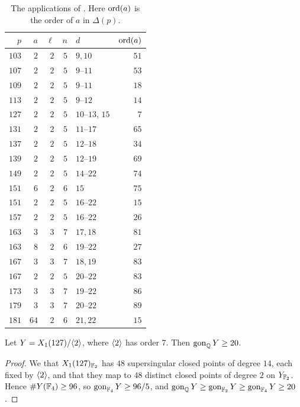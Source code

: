 \begin{table}[H]
\centering
\begin{tabular}{rrrrlr}
\toprule
$p$ & $a$ & $\ell$ & $n$ & $d$ & $\operatorname{ord}(a)$\\
\midrule
$103$ & $2$ & $2$ & $5$ & $9,10$ & $51$\\
$107$ & $2$ & $2$ & $5$ & $9$--$11$ & $53$\\
$109$ & $2$ & $2$ & $5$ & $9$--$11$ & $18$\\
$113$ & $2$ & $2$ & $5$ & $9$--$12$ & $14$\\
$127$ & $2$ & $2$ & $5$ & $10$--$13$, $15$ & $7$\\
$131$ & $2$ & $2$ & $5$ & $11$--$17$ & $65$\\
$137$ & $2$ & $2$ & $5$ & $12$--$18$ & $34$\\
$139$ & $2$ & $2$ & $5$ & $12$--$19$ & $69$\\
$149$ & $2$ & $2$ & $5$ & $14$--$22$ & $74$\\
$151$ & $6$ & $2$ & $6$ & $15$ & $75$\\
$151$ & $2$ & $2$ & $5$ & $16$--$22$ & $15$\\
$157$ & $2$ & $2$ & $5$ & $16$--$22$ & $26$\\
$163$ & $3$ & $3$ & $7$ & $17,18$ & $81$\\
$163$ & $8$ & $2$ & $6$ & $19$--$22$ & $27$\\
$167$ & $3$ & $3$ & $7$ & $18,19$ & $83$\\
$167$ & $2$ & $2$ & $5$ & $20$--$22$ & $83$\\
$173$ & $3$ & $3$ & $7$ & $19$--$22$ & $86$\\
$179$ & $3$ & $3$ & $7$ & $20$--$22$ & $89$\\
$181$ & $64$ & $2$ & $6$ & $21,22$ & $15$\\
\bottomrule
\end{tabular}
\medskip
\caption{The applications of . Here $\operatorname{ord}(a)$ is the order of $a$ in $\Delta(p)$.}
\label{table:medium}
\end{table}

\begin{lemma}\label{lem:gon127}
Let $Y=X_1(127)/\langle 2\rangle$, where $\langle 2\rangle$ has order $7$. Then $\operatorname{gon}_{\mathbb{Q}} Y\geq20$.
\end{lemma}

\begin{proof}
We  that $X_1(127)_{\mathbb{F}_2}$ has $48$ supersingular closed points of degree $14$, each fixed by $\langle 2\rangle$, and that they map to $48$ distinct closed points of degree $2$ on $Y_{\mathbb{F}_2}$. Hence $\#Y(\mathbb{F}_4)\geq96$, so $\operatorname{gon}_{\mathbb{F}_4}Y\geq96/5$, and $\operatorname{gon}_{\mathbb{Q}} Y\geq\operatorname{gon}_{\mathbb{F}_2}Y\geq\operatorname{gon}_{\mathbb{F}_4}Y\geq20$.
\end{proof}

